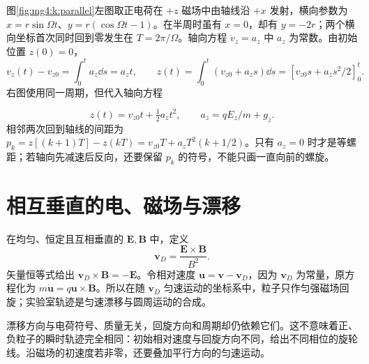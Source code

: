 图\ref{fig:mg4:k:parallel}左图取正电荷在 $+z$ 磁场中由轴线沿 $+x$ 发射，横向参数为 $x=r\sin\Omega t$、$y=r(\cos\Omega t-1)$。在半周时虽有 $x=0$，却有 $y=-2r$；两个横向坐标首次同时回到零发生在 $T=2\pi/\Omega$。轴向方程 $\dot v_z=a_z$ 中 $a_z$ 为常数。由初始位置 $z(0)=0$，
\[
 v_z(t)-v_{z0}=\int_0^t a_z\dd s=a_zt,\qquad
 z(t)=\int_0^t(v_{z0}+a_zs)\dd s
 =[v_{z0}s+a_zs^2/2]_0^t.
\]
右图使用同一周期，但代入轴向方程

\[
 z(t)=v_{z0}t+\tfrac12a_zt^2,\qquad a_z=qE_z/m+g_z.
\]
相邻两次回到轴线的间距为 $p_k=z[(k+1)T]-z(kT)=v_{z0}T+a_zT^2(k+1/2)$。只有 $a_z=0$ 时才是等螺距；若轴向先减速后反向，还要保留 $p_k$ 的符号，不能只画一直向前的螺旋。



\section{相互垂直的电、磁场与漂移}
在均匀、恒定且互相垂直的 $\bm E,\bm B$ 中，定义
\[
\bm v_D=\frac{\bm E\times\bm B}{B^2}.
\]
矢量恒等式给出 $\bm v_D\times\bm B=-\bm E$。令相对速度 $\bm u=\bm v-\bm v_D$，因为 $\bm v_D$ 为常量，原方程化为 $m\dot{\bm u}=q\bm u\times\bm B$。所以在随 $\bm v_D$ 匀速运动的坐标系中，粒子只作匀强磁场回旋；实验室轨迹是匀速漂移与圆周运动的合成。


漂移方向与电荷符号、质量无关，回旋方向和周期却仍依赖它们。这不意味着正、负粒子的瞬时轨迹完全相同：初始相对速度与回旋方向不同，给出不同相位的旋轮线。沿磁场的初速度若非零，还要叠加平行方向的匀速运动。


